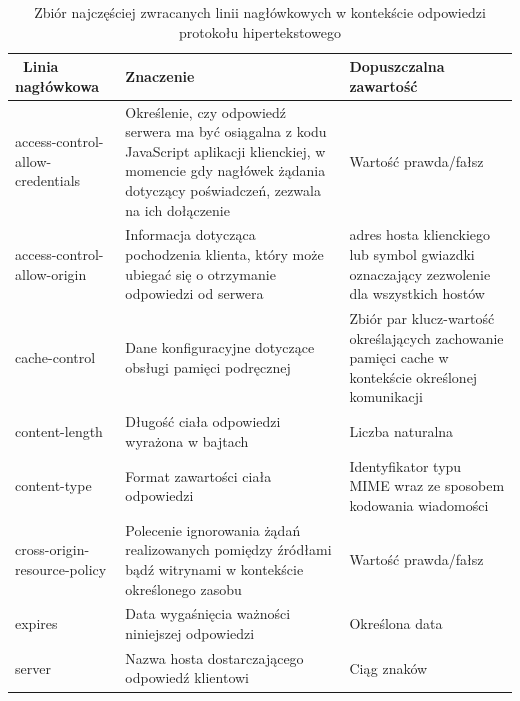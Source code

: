 \begin{table}[htbp] \small
\centering
\caption{Zbiór najczęściej zwracanych linii nagłówkowych w kontekście odpowiedzi protokołu hipertekstowego}
\label{tab:naglowki-odpowiedz}
\begin{tabularx}{\linewidth}{|p{5cm}|X|X|} \hline\
Linia nagłówkowa & Znaczenie & Dopuszczalna zawartość \\ \hline\hline
access-control-allow-credentials & Określenie, czy odpowiedź serwera ma być osiągalna z kodu JavaScript aplikacji klienckiej, w momencie gdy nagłówek żądania dotyczący poświadczeń, zezwala na ich dołączenie & Wartość prawda/fałsz \\ \hline
access-control-allow-origin & Informacja dotycząca pochodzenia klienta, który może ubiegać się o otrzymanie odpowiedzi od serwera & adres hosta klienckiego lub symbol gwiazdki oznaczający zezwolenie dla wszystkich hostów\\ \hline
cache-control & Dane konfiguracyjne dotyczące obsługi pamięci podręcznej & Zbiór par klucz-wartość określających zachowanie pamięci cache w kontekście określonej komunikacji\\ \hline
content-length & Długość ciała odpowiedzi wyrażona w bajtach & Liczba naturalna\\ \hline
content-type & Format zawartości ciała odpowiedzi & Identyfikator typu MIME wraz ze sposobem kodowania wiadomości\\ \hline
cross-origin-resource-policy & Polecenie ignorowania żądań realizowanych pomiędzy źródłami bądź witrynami w kontekście określonego zasobu  & Wartość prawda/fałsz \\ \hline
expires & Data wygaśnięcia ważności niniejszej odpowiedzi & Określona data \\ \hline
server & Nazwa hosta dostarczającego odpowiedź klientowi & Ciąg znaków \\ \hline
\end{tabularx}
\end{table}

